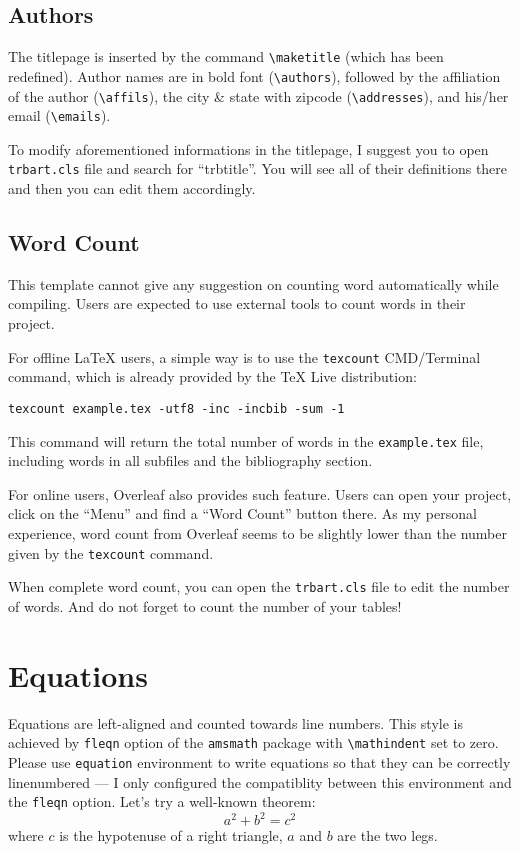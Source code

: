 \documentclass[12pt]{trbart}
\begin{document}
\subsection{Authors}
The titlepage is inserted by the command \verb+\maketitle+ (which has been redefined). Author names are in bold font (\verb+\authors+), followed by the affiliation of the author (\verb+\affils+), the city \& state with zipcode (\verb+\addresses+), and his/her email (\verb+\emails+). 

To modify aforementioned informations in the titlepage, I suggest you to open \texttt{trbart.cls} file and search for ``trbtitle''. You will see all of their definitions there and then you can edit them accordingly. 

\subsection{Word Count}
This template cannot give any suggestion on counting word automatically while compiling. Users are expected to use external tools to count words in their project. 

For offline LaTeX users, a simple way is to use the \texttt{texcount} CMD/Terminal command, which is already provided by the TeX Live distribution:
\begin{verbatim}
texcount example.tex -utf8 -inc -incbib -sum -1 
\end{verbatim}
This command will return the total number of words in the \texttt{example.tex} file, including words in all subfiles and the bibliography section.

For online users, Overleaf also provides such feature. Users can open your project, click on the ``Menu'' and find a ``Word Count'' button there. As my personal experience, word count from Overleaf seems to be slightly lower than the number given by the \texttt{texcount} command.

When complete word count, you can open the \texttt{trbart.cls} file to edit the number of words. And do not forget to count the number of your tables!


\section{Equations}
Equations are left-aligned and counted towards line numbers. This style is achieved by \texttt{fleqn} option of the \texttt{amsmath} package with \verb+\mathindent+ set to zero. Please use \texttt{equation} environment to write equations so that they can be correctly linenumbered --- I only configured the compatiblity between this environment and the \texttt{fleqn} option. Let's try a well-known theorem:
\begin{equation}\label{eq:triangle}
    a^2 + b^2 = c^2
\end{equation}
where \(c\) is the hypotenuse of a right triangle, \(a\) and \(b\) are the two legs.
\end{document}
